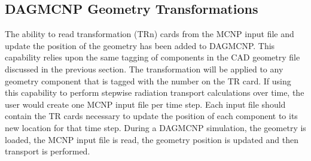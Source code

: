 \subsection{DAGMCNP Geometry Transformations}\label{sec:mcnp_tr}
The ability to read transformation (TRn) cards from the MCNP input file and 
update the position of the geometry has been added to DAGMCNP.  This
 capability relies upon the same tagging of components in the CAD geometry 
file discussed in the previous section.  The transformation will be applied to any 
geometry component that is tagged with the number on the TR card.  If using 
this capability to perform stepwise radiation transport calculations over time, 
the user would create one MCNP input file per time step.  Each input file 
should contain the TR cards necessary to update the position of each component 
to its new location for that time step.  During a DAGMCNP simulation, the 
geometry is loaded, the MCNP input file is read, the geometry position is 
updated and then transport is performed.


